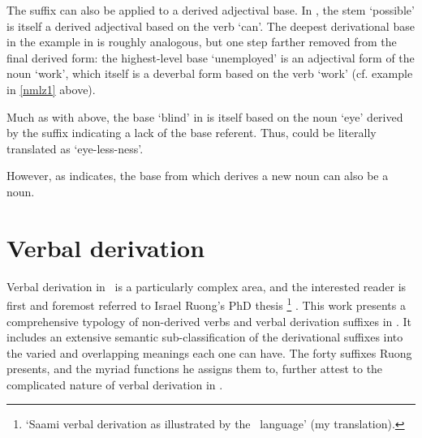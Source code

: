The suffix  can also be applied to a derived adjectival base. In , the stem  ‘possible’ is itself a derived adjectival based on the verb  ‘can’. The deepest derivational base in the example in  is roughly analogous, but one step farther removed from the final derived form: the highest-level base  ‘unemployed’ is an adjectival form of the noun  ‘work’, which itself is a deverbal form based on the verb  ‘work’ (cf. example  in \SEC\ref{nmlz1} above). 
\ea\label{vuohtaEx5}
\z
\ea\label{vuohtaEx6}
\z

Much as with  above, the base  ‘blind’ in  is itself based on the noun  ‘eye’ derived by the suffix  indicating a lack of the base referent. Thus,  could be literally translated as ‘eye-less-ness’. 
\ea\label{vuohtaEx7}
\z

However, as  indicates, the base from which  derives a new noun can also be a noun. 
\ea\label{vuohtaEx4}
\z



\section{Verbal derivation}\label{vDerivation}%
Verbal derivation in \PS\ is a particularly complex area, and the interested reader is first and foremost referred to Israel Ruong’s PhD thesis \footnote{‘Saami verbal derivation as illustrated by the \PS\ language’ (my translation).} 
\citep{Ruong1943}. This work presents a comprehensive typology of non-derived verbs and verbal derivation suffixes in \PS. %
It includes an extensive semantic sub-classification of the derivational suffixes into the varied and overlapping meanings each one can have. The forty suffixes Ruong presents, and the myriad functions he assigns them to, further attest to the complicated nature of verbal derivation in \PS. 

